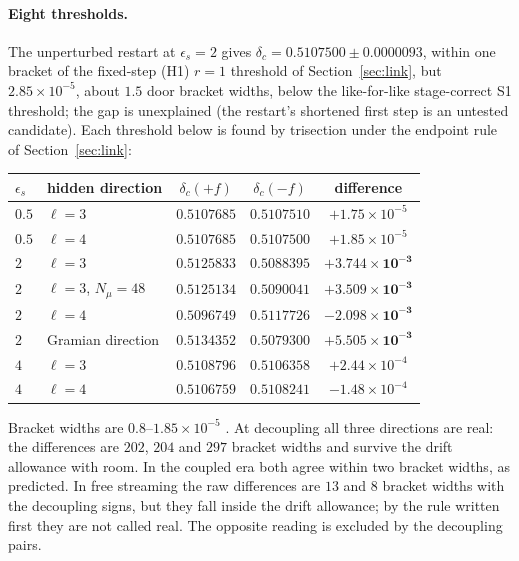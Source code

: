 \paragraph{Eight thresholds.} The unperturbed restart at $\epsilon_s=2$ gives $\delta_c=0.5107500\pm0.0000093$, within one bracket of the fixed-step (H1) $r=1$ threshold of Section~\ref{sec:link}, but $2.85\times10^{-5}$, about $1.5$ door bracket widths, below the like-for-like stage-correct S1 threshold; the gap is unexplained (the restart's shortened first step is an untested candidate). Each threshold below is found by trisection under the endpoint rule of Section~\ref{sec:link}:
\begin{center}\small\begin{tabular}{llccc}\toprule
$\epsilon_s$ & hidden direction & $\delta_c(+f)$ & $\delta_c(-f)$ & difference\\\midrule
$0.5$ & $\ell=3$ & $0.5107685$ & $0.5107510$ & $+1.75\times10^{-5}$\\
$0.5$ & $\ell=4$ & $0.5107685$ & $0.5107500$ & $+1.85\times10^{-5}$\\
$2$ & $\ell=3$ & $0.5125833$ & $0.5088395$ & $\mathbf{+3.744\times10^{-3}}$\\
$2$ & $\ell=3$, $N_\mu=48$ & $0.5125134$ & $0.5090041$ & $\mathbf{+3.509\times10^{-3}}$\\
$2$ & $\ell=4$ & $0.5096749$ & $0.5117726$ & $\mathbf{-2.098\times10^{-3}}$\\
$2$ & Gramian direction & $0.5134352$ & $0.5079300$ & $\mathbf{+5.505\times10^{-3}}$\\
$4$ & $\ell=3$ & $0.5108796$ & $0.5106358$ & $+2.44\times10^{-4}$\\
$4$ & $\ell=4$ & $0.5106759$ & $0.5108241$ & $-1.48\times10^{-4}$\\\bottomrule\end{tabular}\end{center}
Bracket widths are $0.8$--$1.85\times10^{-5}$ . At decoupling all three directions are real: the differences are $202$, $204$ and $297$ bracket widths and survive the drift allowance with room. In the coupled era both agree within two bracket widths, as predicted. In free streaming the raw differences are $13$ and $8$ bracket widths with the decoupling signs, but they fall inside the drift allowance; by the rule written first they are not called real. The opposite reading is excluded by the decoupling pairs.

